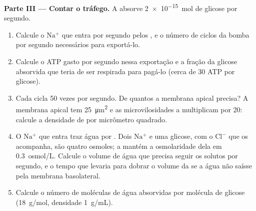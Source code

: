 \begin{problem}
\medskip
\noindent\textbf{Parte III --- Contar o tráfego.}
A  absorve \qty{2e-15}{mol} de glicose por segundo.
\begin{enumerate}[resume]
  \item Calcule o $\mathrm{Na^+}$ que entra por segundo pelos
        , e o número de ciclos da bomba por segundo
        necessários para exportá-lo.
  \item Calcule o ATP gasto por segundo nessa exportação e a fração da
        glicose absorvida que teria de ser respirada para pagá-lo (cerca
        de 30 ATP por glicose).
  \item Cada  cicla \qty{50}{} vezes por segundo. De quantos
         a membrana apical precisa? A membrana apical tem
        \qty{25}{\micro m^2} e as microvilosidades a multiplicam por
        \qty{20}{}: calcule a densidade de  por micrômetro
        quadrado.
  \item O $\mathrm{Na^+}$ que entra traz água por . Dois
        $\mathrm{Na^+}$ e uma glicose, com o $\mathrm{Cl^-}$ que os
        acompanha, são quatro osmoles; a  mantém a osmolaridade
        dela em \qty{0.3}{osmol/L}. Calcule o volume de água que precisa
        seguir os solutos por segundo, e o tempo que levaria para dobrar
        o volume da  se a água não saísse pela membrana
        basolateral.
  \item Calcule o número de moléculas de água absorvidas por molécula de
        glicose (\qty{18}{g/mol}, densidade \qty{1}{g/mL}).
\end{enumerate}


\end{problem}
